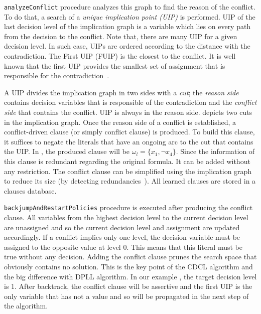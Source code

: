 \texttt{analyzeConflict} procedure analyzes this graph to find the reason of the conflict. To do that, a search of a
\emph{unique implication point (UIP)} is performed. UIP of the last decision level of the implication graph is a variable
which lies on every path from the decision to the conflict. Note that, there are many UIP for a given decision level.
In such case, UIPs are ordered according to the distance with the contradiction. The First UIP (FUIP) is the closest to
the conflict. It is well known that the first UIP provides the smallest set of assignment that is responsible for the
contradiction~\cite{zhang2001efficient}.

A UIP divides the implication graph in two sides with a \emph{cut}; the \emph{reason side} contains decision variables 
that is responsible of the contradiction and the \emph{conflict side} that contains the conflict. 
 UIP is always in the reason side.  depicts two cuts in the implication graph.
Once the reason side of a conflict is established, a conflict-driven clause (or simply conflict clause) is produced.
To build this clause, it suffices to negate the
literals that have an ongoing arc to the  cut that contains the UIP. In , the produced
clause will be $\omega_l = \{x_1, \neg x_4 \}$. Since the information of this clause is redundant regarding 
the original formula. It can be added without any  restriction. The conflict clause can be simplified
using the implication graph to reduce its size (by detecting redundancies~\cite{sorensson2009minimizing}).
 All learned clauses are stored in a clauses database.
 
  \texttt{backjumpAndRestartPolicies} procedure is executed after producing the conflict clause.
All variables from the highest decision level to the current decision level are unassigned and so 
the current decision level and assignment are updated accordingly.
If a conflict implies only one level, the decision variable must be assigned 
to the opposite value at level 0. This means that this literal must be true without any decision.
Adding the conflict clause prunes the search space that obviously contains no solution.
This is the key point of the CDCL algorithm and the big difference with DPLL algorithm.
 In our example , the target decision level is 1.
After backtrack, the conflict clause will be assertive and the first UIP is the only variable that has
not a value and so will be propagated in the next step of the algorithm.

